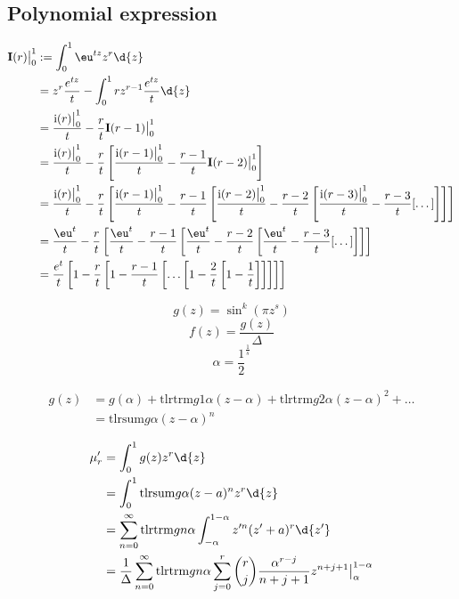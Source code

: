 \subsection{Polynomial expression}

\newcommand{\I}{\mathbf I}
\newcommand{\M}{\mathbb M}
\renewcommand{\i}{\mathrm i}
\newcommand{\tlrtrm}{\mathrm{tlrtrm}}
\newcommand{\tlrsum}{\mathrm{tlrsum}}
\begin{thm}
    \begin{align*}
    \I(r) \big|_0^1
        &:= \int_{0}^{1} \eu^{tz} z^r \d{z} \\
        &= z^r \frac{e^{tz}}{t} - \int_0^1 r z^{r-1} \frac{e^{tz}}{t} \d{z} \\
        &= \frac{\i(r) \big|_0^1}{t}-\frac{r}{t} \I(r-1) \big|_0^1 \\
        &= \frac{\i(r) \big|_0^1}{t}-\frac{r}{t} \left[ \frac{\i(r-1) \big|_0^1}{t}-\frac{r-1}{t} \I(r-2) \big|_0^1 \right] \\
        &= \frac{\i(r) \big|_0^1}{t}-\frac{r}{t} \left[ \frac{\i(r-1) \big|_0^1}{t}-\frac{r-1}{t}  \left[ \frac{\i(r-2) \big|_0^1}{t}-\frac{r-2}{t} \left[ \frac{\i(r-3) \big|_0^1}{t}-\frac{r-3}{t} [\dots] \right] \right] \right] \\
        &= \frac{\eu^{t}}{t}-\frac{r}{t} \left[ \frac{\eu^{t}}{t}-\frac{r-1}{t}  \left[ \frac{\eu^{t}}{t}-\frac{r-2}{t} \left[ \frac{\eu^{t}}{t}-\frac{r-3}{t} [\dots] \right] \right] \right] \\
        &= \frac{e^{t}}{t} \left[ 1 - \frac{r}{t} \left[ 1 - \frac{r-1}{t} \left[ \dots \left[ 1 - \frac{2}{t} \left[ 1 - \frac{1}{t} \right] \right] \right] \right] \right]
    \end{align*}
\end{thm}

\[ g(z) = \sin^k (\pi z^s) \]
\[ f(z) = \frac{g(z)}{\Delta} \]
\[ \alpha = \frac{1}{2}^\frac{1}{s} \]

\begin{align}
    g(z)
    &= g(\alpha) + \tlrtrm{g}{1}{\alpha} (z-\alpha) + \tlrtrm{g}{2}{\alpha} (z-\alpha)^2 + \dots \\
    &= \tlrsum{g}{\alpha} (z-\alpha)^n
\end{align}

\begin{align*}
    \mu'_r
    &= \int_0^1 g(z) z^r \d{z} \\
    &= \int_0^1 \tlrsum{g}{\alpha} (z-a)^n z^r \d{z} \\
    &= \sum_{n=0}^\infty \tlrtrm{g}{n}{\alpha} \int_{-\alpha}^{1-\alpha} z'^n (z'+a)^r \d{z'} \\
    &= \frac{1}{\Delta} \sum_{n=0}^{\infty} \tlrtrm{g}{n}{\alpha} \sum_{j=0}^{r} {r \choose j} \frac{\alpha^{r-j}}{n+j+1} z^{n+j+1} \big|_{\alpha}^{1-\alpha}
\end{align*}

